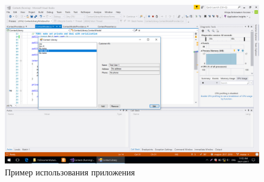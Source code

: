 \documentclass[14pt,a4paper]{extreport}
\begin{document}
\begin{figure}[h]
\includegraphics[scale=0.5]{../screenshots/Screenshot_3}
\caption{Пример использования приложения}
\end{figure}
\end{document}
